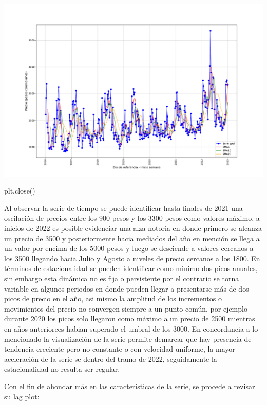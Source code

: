 \documentclass[
]{book}
\newenvironment{Shaded}{\begin{snugshade}}{\end{snugshade}}
\newcommand{\NormalTok}[1]{#1}
\begin{document}
\includegraphics{bookdown-demo_files/figure-latex/unnamed-chunk-119-105.pdf}

\begin{Shaded}
\begin{Highlighting}[]
\NormalTok{plt.close()}
\end{Highlighting}
\end{Shaded}

Al observar la serie de tiempo se puede identificar hasta finales de 2021 una oscilación de precios entre los 900 pesos y los 3300 pesos como valores máximo, a inicios de 2022 es posible evidenciar una alza notoria en donde primero se alcanza un precio de 3500 y posteriormente hacia mediados del año en mención se llega a un valor por encima de los 5000 pesos y luego se desciende a valores cercanos a los 3500 llegando hacia Julio y Agosto a niveles de precio cercanos a los 1800. En términos de estacionalidad se pueden identificar como minimo dos picos anuales, sin embargo esta dinámica no es fija o persistente por el contrario se torna variable en algunos periodos en donde pueden llegar a presentarse más de dos picos de precio en el año, asi mismo la amplitud de los incrementos o movimientos del precio no convergen siempre a un punto común, por ejemplo durante 2020 los picos solo llegaron como máximo a un precio de 2500 mientras en años anteriorees habian superado el umbral de los 3000. En concordancia a lo mencionado la visualización de la serie permite demarcar que hay presencia de tendencia creciente pero no constante o con velocidad uniforme, la mayor aceleración de la serie se dentro del tramo de 2022, seguidamente la estacionalidad no resulta ser regular.

Con el fin de ahondar más en las caracteristicas de la serie, se procede a revisar su lag plot:
\end{document}
